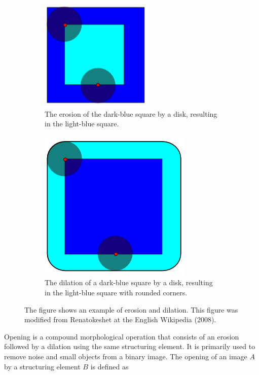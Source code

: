 \begin{figure}[h]
    \centering
    \begin{subfigure}[t]{0.45\textwidth}
        \centering
        \includegraphics[width=0.5\linewidth]{figures/detection/erosion.png}
        \caption{The erosion of the dark-blue square by a disk, resulting in the light-blue square.}
        \label{fig:erosion}
    \end{subfigure}
    \begin{subfigure}[t]{0.45\textwidth}
        \centering
        \includegraphics[width=0.5\linewidth]{figures/detection/dilation.png}
        \caption{The dilation of a dark-blue square by a disk, resulting in the light-blue square with rounded corners.}
        \label{fig:dilation}
    \end{subfigure}
    \caption{The figure shows an example of erosion and dilation. This figure was modified from Renatokeshet at the English Wikipedia (2008).}
    \label{fig:erosion_and_dilation}
\end{figure}

Opening is a compound morphological operation that consists of an erosion followed by a dilation using the same structuring element. It is primarily used to remove noise and small objects from a binary image. The opening of an image $A$ by a structuring element $B$ is defined as

